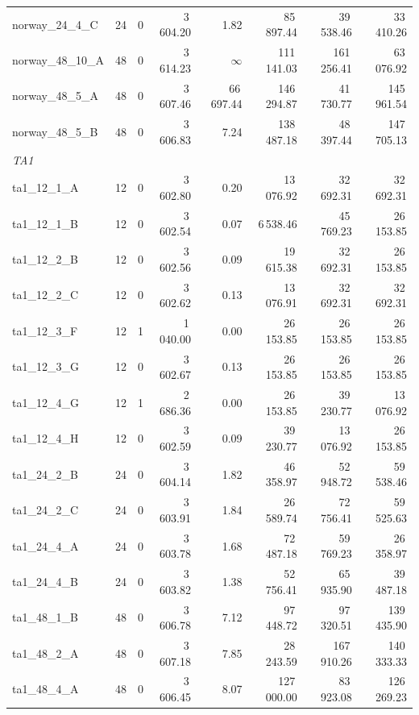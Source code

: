 \documentclass{article}
\begin{document}
\begin{table}[h!]
\begin{tabular}{@{}l r c r r r r r@{}}
norway\_24\_4\_C & 24 & 0 & 3\,604.20 & 1.82 & 85\,897.44 & 39\,538.46 & 33\,410.26 \\
norway\_48\_10\_A & 48 & 0 & 3\,614.23 & $\infty$ & 111\,141.03 & 161\,256.41 & 63\,076.92 \\
norway\_48\_5\_A & 48 & 0 & 3\,607.46 & 66\,697.44 & 146\,294.87 & 41\,730.77 & 145\,961.54 \\
norway\_48\_5\_B & 48 & 0 & 3\,606.83 & 7.24 & 138\,487.18 & 48\,397.44 & 147\,705.13 \\
\midrule
\multicolumn{8}{l}{\textit{TA1}} \\
\midrule
ta1\_12\_1\_A & 12 & 0 & 3\,602.80 & 0.20 & 13\,076.92 & 32\,692.31 & 32\,692.31 \\
ta1\_12\_1\_B & 12 & 0 & 3\,602.54 & 0.07 & 6\,538.46 & 45\,769.23 & 26\,153.85 \\
ta1\_12\_2\_B & 12 & 0 & 3\,602.56 & 0.09 & 19\,615.38 & 32\,692.31 & 26\,153.85 \\
ta1\_12\_2\_C & 12 & 0 & 3\,602.62 & 0.13 & 13\,076.91 & 32\,692.31 & 32\,692.31 \\
ta1\_12\_3\_F & 12 & 1 & 1\,040.00 & 0.00 & 26\,153.85 & 26\,153.85 & 26\,153.85 \\
ta1\_12\_3\_G & 12 & 0 & 3\,602.67 & 0.13 & 26\,153.85 & 26\,153.85 & 26\,153.85 \\
ta1\_12\_4\_G & 12 & 1 & 2\,686.36 & 0.00 & 26\,153.85 & 39\,230.77 & 13\,076.92 \\
ta1\_12\_4\_H & 12 & 0 & 3\,602.59 & 0.09 & 39\,230.77 & 13\,076.92 & 26\,153.85 \\
ta1\_24\_2\_B & 24 & 0 & 3\,604.14 & 1.82 & 46\,358.97 & 52\,948.72 & 59\,538.46 \\
ta1\_24\_2\_C & 24 & 0 & 3\,603.91 & 1.84 & 26\,589.74 & 72\,756.41 & 59\,525.63 \\
ta1\_24\_4\_A & 24 & 0 & 3\,603.78 & 1.68 & 72\,487.18 & 59\,769.23 & 26\,358.97 \\
ta1\_24\_4\_B & 24 & 0 & 3\,603.82 & 1.38 & 52\,756.41 & 65\,935.90 & 39\,487.18 \\
ta1\_48\_1\_B & 48 & 0 & 3\,606.78 & 7.12 & 97\,448.72 & 97\,320.51 & 139\,435.90 \\
ta1\_48\_2\_A & 48 & 0 & 3\,607.18 & 7.85 & 28\,243.59 & 167\,910.26 & 140\,333.33 \\
ta1\_48\_4\_A & 48 & 0 & 3\,606.45 & 8.07 & 127\,000.00 & 83\,923.08 & 126\,269.23 \\
\bottomrule
\end{tabular}
\end{table}
\end{document}
